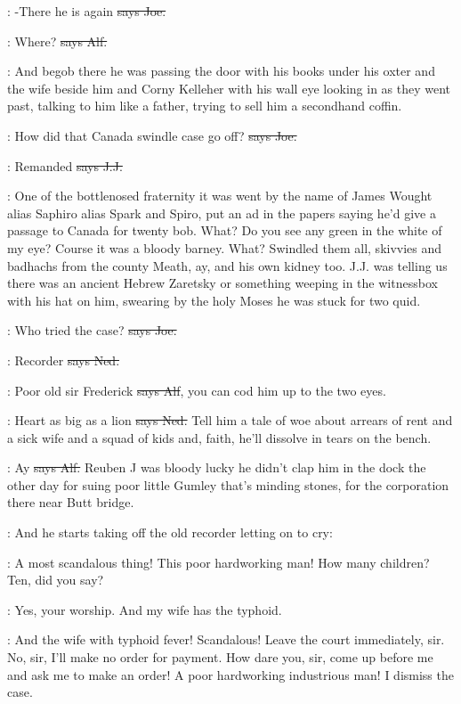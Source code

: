 \joe:
-There he is again
\sout{says Joe.}

\bergan:
Where?
\sout{says Alf.}

\Nq:
And begob there he was
passing the door with his books under his
oxter and the wife beside him and Corny Kelleher with his wall eye looking
in as they went past,
talking to him like a father,
trying to sell him a
secondhand coffin.

\joe:
How did that Canada swindle case go off?
\sout{says Joe.}

\jjom:
Remanded
\sout{says J.J.}

\Nq:
One of the bottlenosed fraternity it was went by the name of James
Wought alias Saphiro alias Spark and Spiro,
put an ad in the papers saying
he'd give a passage to Canada for twenty bob.
What?
Do you see any green
in the white of my eye?
Course it was a bloody barney.
What?
Swindled
them all,
skivvies and badhachs from the county Meath,
ay,
and his own
kidney too.
J.J.
was telling us there was an ancient Hebrew Zaretsky or
something weeping in the witnessbox with his hat on him,
swearing by the
holy Moses he was stuck for two quid.

\joe:
Who tried the case?
\sout{says Joe.}

\lambert:
Recorder
\sout{says Ned.}

\bergan:
Poor old sir Frederick
\sout{says Alf},
you can cod him up to the two eyes.

\lambert:
Heart as big as a lion
\sout{says Ned.}
Tell him a tale of woe about arrears
of rent and a sick wife and a squad of kids and,
faith,
he'll dissolve in
tears on the bench.

\bergan:
Ay
\sout{says Alf.}
Reuben J was bloody lucky he didn't clap him in the dock
the other day for suing poor little Gumley that's minding stones,
for the
corporation there near Butt bridge.

\Nq:
And he starts taking off the old recorder letting on to cry:

\bergan:
A most scandalous thing!
This poor hardworking man!
How many
children?
Ten,
did you say?

\bergan:
Yes,
your worship.
And my wife has the typhoid.

\bergan:
And the wife with typhoid fever!
Scandalous!
Leave the court
immediately,
sir.
No,
sir,
I'll make no order for payment.
How dare you,
sir,
come up before me and ask me to make an order!
A poor hardworking
industrious man!
I dismiss the case.

